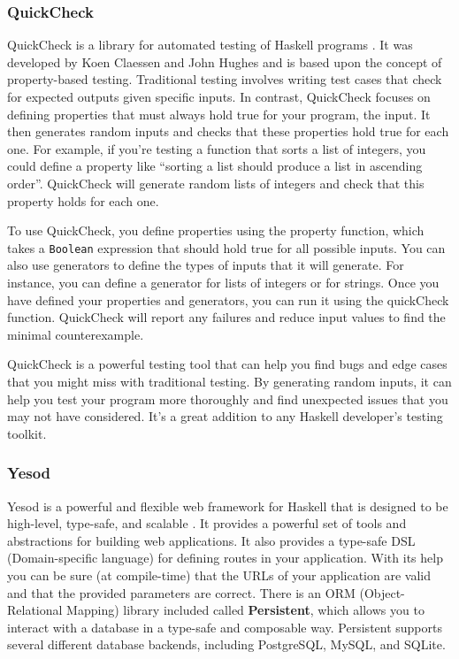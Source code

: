 \documentclass[a4paper, titlepage, twoside]{article}
\begin{document}
\subsubsection{QuickCheck}
\label{sec:orgcc0955b}

QuickCheck is a library for automated testing of Haskell programs \autocite{claessenQuickCheckAutomaticTesting}. It was developed by Koen Claessen and John Hughes and is based upon the concept of property-based testing. Traditional testing involves writing test cases that check for expected outputs given specific inputs. In contrast, QuickCheck focuses on defining properties that must always hold true for your program, the input. It then generates random inputs and checks that these properties hold true for each one. For example, if you're testing a function that sorts a list of integers, you could define a property like ``sorting a list should produce a list in ascending order''. QuickCheck will generate random lists of integers and check that this property holds for each one.

To use QuickCheck, you define properties using the property function, which takes a \texttt{Boolean} expression that should hold true for all possible inputs. You can also use generators to define the types of inputs that it will generate. For instance, you can define a generator for lists of integers or for strings. Once you have defined your properties and generators, you can run it using the quickCheck function. QuickCheck will report any failures and reduce input values to find the minimal counterexample.

QuickCheck is a powerful testing tool that can help you find bugs and edge cases that you might miss with traditional testing. By generating random inputs, it can help you test your program more thoroughly and find unexpected issues that you may not have considered. It's a great addition to any Haskell developer's testing toolkit.

\subsubsection{Yesod}
\label{sec:orgf7ae63d}

Yesod is a powerful and flexible web framework for Haskell that is designed to be high-level, type-safe, and scalable \autocite{yesodYesodWebFramework2023}. It provides a powerful set of tools and abstractions for building web applications. It also provides a type-safe DSL (Domain-specific language) for defining routes in your application. With its help you can be sure (at compile-time) that the URLs of your application are valid and that the provided parameters are correct. There is an ORM (Object-Relational Mapping) library included called \textbf{Persistent}, which allows you to interact with a database in a type-safe and composable way. Persistent supports several different database backends, including PostgreSQL, MySQL, and SQLite.
\end{document}
